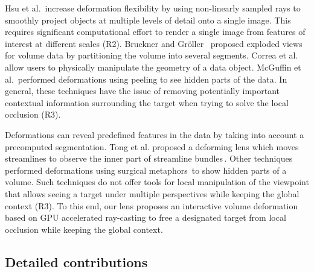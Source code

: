 Hsu et al.\,\cite{Hsu:2011:RFM:2070781.2024165} increase deformation flexibility by using non-linearly sampled rays to smoothly project objects at multiple levels of detail onto a single image. This requires significant computational effort to render a single image from features of interest at different scales (R2). Bruckner and Gr{\"o}ller~\cite{4015467} proposed exploded views for volume data by partitioning the volume into several segments. Correa et al.\,\cite{Correa:2007:IDD:1313046.1313163} allow users to physically manipulate the geometry of a data object. McGuffin et al.\,\cite{1250400} performed deformations using peeling to see hidden parts of the data. In general, these techniques have the issue of removing potentially important contextual information surrounding the target when trying to solve the local occlusion (R3).

Deformations can reveal predefined features in the data by taking into account a precomputed segmentation. Tong et al. proposed a deforming lens which moves streamlines to observe the inner part of streamline bundles\,\cite{7332955}. Other techniques performed deformations using surgical metaphors\,\cite{4069230,Correa:2006:FAV:1187627.1187827} to show hidden parts of a volume. Such techniques do not offer tools for local manipulation of the viewpoint that allows seeing a target under multiple perspectives while keeping the global context (R3). To this end, our lens proposes an interactive volume deformation based on GPU accelerated ray-casting to free a designated target from local occlusion while keeping the global context.

\vspace{-0.09cm}
\subsection{Detailed contributions}
%

